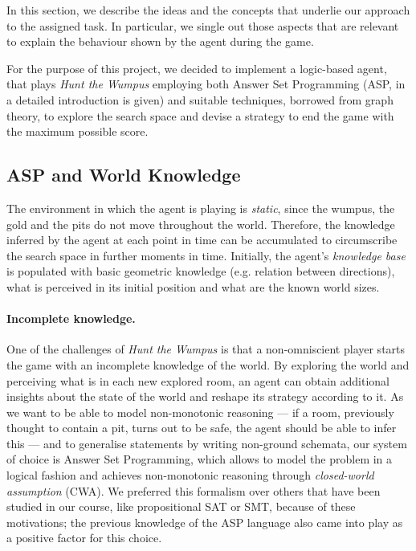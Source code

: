 \documentclass{llncs}
\newcommand{\htw}{\emph{Hunt the Wumpus}\xspace}
\begin{document}
In this section, we describe the ideas and the concepts that underlie our approach to the assigned task.
In particular, we single out those aspects that are relevant to explain the behaviour shown by the agent during the game.

For the purpose of this project, we decided to implement a logic-based agent, that plays \htw employing both Answer Set Programming (ASP, in~\cite{ASPprimer} a detailed introduction is given) and suitable techniques, borrowed from graph theory, to explore the search space and devise a strategy to end the game with the maximum possible score.

\subsection{ASP and World Knowledge}

The environment in which the agent is playing is \emph{static}, since the wumpus, the gold and the pits do not move throughout the world.
Therefore, the knowledge inferred by the agent at each point in time can be accumulated to circumscribe the search space in further moments in time.
Initially, the agent's \emph{knowledge base} is populated with basic geometric knowledge (e.g. relation between directions), what is perceived in its initial position and what are the known world sizes.

\paragraph{Incomplete knowledge.} One of the challenges of \htw is that a non-omniscient player starts the game with an incomplete knowledge of the world.
By exploring the world and perceiving what is in each new explored room, an agent can obtain additional insights about the state of the world and reshape its strategy according to it.
As we want to be able to model non-monotonic reasoning --- if a room, previously thought to contain a pit, turns out to be safe, the agent should be able to infer this --- and to generalise statements by writing non-ground schemata, our system of choice is Answer Set Programming, which allows to model the problem in a logical fashion and achieves non-monotonic reasoning through \emph{closed-world assumption} (CWA).
We preferred this formalism over others that have been studied in our course, like propositional SAT or SMT, because of these motivations; the previous knowledge of the ASP language also came into play as a positive factor for this choice.
\end{document}
